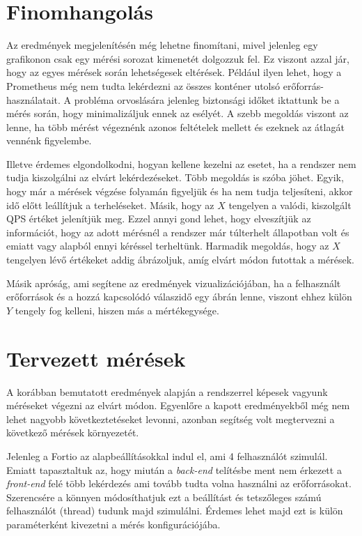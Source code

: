 \section{Finomhangolás}
Az eredmények megjelenítésén még lehetne finomítani, mivel jelenleg egy grafikonon csak egy mérési sorozat kimenetét dolgozzuk fel. Ez viszont azzal jár, hogy az egyes mérések során lehetségesek eltérések. Például ilyen lehet, hogy a Prometheus még nem tudta lekérdezni az összes konténer utolsó erőforrás-használatait. A probléma orvoslására jelenleg biztonsági időket iktattunk be a mérés során, hogy minimalizáljuk ennek az esélyét. A szebb megoldás viszont az lenne, ha több mérést végeznénk azonos feltételek mellett és ezeknek az átlagát vennénk figyelembe.

Illetve érdemes elgondolkodni, hogyan kellene kezelni az esetet, ha a rendszer nem tudja kiszolgálni az elvárt lekérdezéseket. Több megoldás is szóba jöhet. Egyik, hogy már a mérések végzése folyamán figyeljük és ha nem tudja teljesíteni, akkor idő előtt leállítjuk a terheléseket. Másik, hogy az $X$ tengelyen a valódi, kiszolgált QPS értéket jelenítjük meg. Ezzel annyi gond lehet, hogy elveszítjük az információt, hogy az adott mérésnél a rendszer már túlterhelt állapotban volt és emiatt vagy alapból ennyi kéréssel terheltünk. Harmadik megoldás, hogy az $X$ tengelyen lévő értékeket addig ábrázoljuk, amíg elvárt módon futottak a mérések.

Másik apróság, ami segítene az eredmények vizualizációjában, ha a felhasznált erőforrások és a hozzá kapcsolódó válaszidő egy ábrán lenne, viszont ehhez külön $Y$ tengely fog kelleni, hiszen más a mértékegysége.  

\section{Tervezett mérések}
A korábban bemutatott eredmények alapján a rendszerrel képesek vagyunk méréseket végezni az elvárt módon. Egyenlőre a kapott eredményekből még nem lehet nagyobb következtetéseket levonni, azonban segítség volt megtervezni a következő mérések környezetét. 

Jelenleg a Fortio az alapbeállításokkal indul el, ami 4 felhasználót szimulál. Emiatt tapasztaltuk az, hogy miután a \textit{back-end} telítésbe ment nem érkezett a \textit{front-end} felé több lekérdezés ami tovább tudta volna használni az erőforrásokat.  Szerencsére a könnyen módosíthatjuk ezt a beállítást és tetszőleges számú felhasználót (thread) tudunk majd szimulálni. Érdemes lehet majd ezt is külön paraméterként kivezetni a mérés konfigurációjába.

